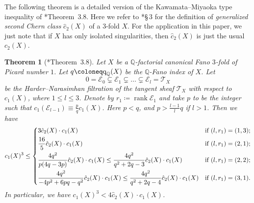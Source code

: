 \documentclass[12pt,twoside]{amsart}
\DeclareMathOperator{\rank}{rank}
\newcommand{\qQ}{\text{\rm q}_{\mathbb{Q}}}
\newtheorem{thm}{Theorem}[section]
\theoremstyle{definition}
\begin{document}
The following theorem is a detailed version of the Kawamata--Miyaoka type inequality of \cite{jiang-liu-liu}*{Theorem~3.8}. Here we refer to \cite{jiang-liu-liu}*{\S\,3} for the definition of \emph{generalized second Chern class} $\hat{c}_2(X)$ of a $3$-fold $X$. For the application in this paper, we just note that if $X$ has only isolated singularities, then $\hat{c}_2(X)$ is just the usual $c_2(X)$.

\begin{thm}[\cite{jiang-liu-liu}*{Theorem~3.8}]\label{thm.kmineqforisolated}
    Let $X$ be a $\mathbb{Q}$-factorial canonical Fano $3$-fold of Picard number $1$. Let $q\coloneq \qQ(X)$ be the $\mathbb{Q}$-Fano index of $X$. Let
    \begin{equation}\label{eq.hnfiltration}
        0=\mathcal{E}_0\subsetneq \mathcal{E}_1\subsetneq \dots \subsetneq \mathcal{E}_l=\mathcal{T}_X
    \end{equation}
    be the Harder--Narasimhan filtration of the tangent sheaf $\mathcal T_X$ with respect to $c_1(X)$, where $1\leq l\leq 3$. Denote by $r_1\coloneq\rank \mathcal{E}_1$ and take $p$ to be the integer such that $c_1(\mathcal{E}_{l-1})\equiv \frac{p}{q}c_1(X)$. Here $p<q$, and $p>\frac{l-1}{l}q$ if $l>1$. Then we have
    \[
        c_1(X)^3 \leq 
        \begin{dcases}
        3 \hat{c}_2(X)\cdot c_1(X) & \text{if } (l, r_1)=(1,3);\\
        \frac{16}{5} \hat{c}_2(X)\cdot c_1(X) & \text{if } (l, r_1)=(2,1);\\
        \frac{4q^2}{p(4q-3p)} \hat{c}_2(X)\cdot c_1(X)\leq \frac{4q^2}{q^2+2q-3} \hat{c}_2(X)\cdot c_1(X)& \text{if } (l, r_1)=(2,2);\\
        \frac{4q^2}{-4p^2+6pq-q^2} \hat{c}_2(X)\cdot c_1(X)\leq \frac{4q^2}{q^2+2q-4} \hat{c}_2(X)\cdot c_1(X)& \text{if } (l, r_1)=(3,1).
        \end{dcases}
    \]
    In particular, we have $c_1(X)^3<4\hat{c}_2(X)\cdot c_1(X)$.
\end{thm}
\end{document}
